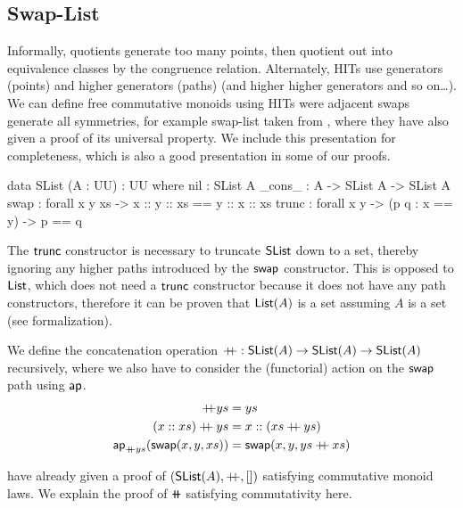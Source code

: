 \subsection{Swap-List}\label{cmon:slist}

Informally, quotients generate too many points, then quotient out into equivalence classes by the congruence relation.
%
Alternately, HITs use generators (points) and higher generators (paths) (and higher higher generators and so on\ldots).
%
We can define free commutative monoids using HITs were adjacent swaps generate all symmetries,
for example swap-list taken from \cite{choudhuryFreeCommutativeMonoids2023}, where they have also given a proof of its
universal property. We include this presentation for completeness, which is also a good presentation in some of our
proofs.

\begin{code}
data SList (A : UU) : UU where
  nil : SList A
  _cons_ : A -> SList A -> SList A
  swap : forall x y xs -> x :: y :: xs == y :: x :: xs
  trunc : forall x y -> (p q : x == y) -> p == q
\end{code}
\vspace{1em}

The $\operatorname{\mathsf{trunc}}$ constructor is necessary to truncate $\operatorname{\mathsf{SList}}$ down to a set,
thereby ignoring any higher paths introduced by the $\operatorname{\mathsf{swap}}$ constructor.
This is opposed to $\operatorname{\mathsf{List}}$, which does not need a $\operatorname{\mathsf{trunc}}$ constructor
because it does not have any path constructors, therefore it can be proven that $\operatorname{\mathsf{List}}(A)$
is a set assuming $A$ is a set (see formalization).

\begin{definition}[Concatenation]
    We define the concatenation operation $\mathbin{+\kern -0.4em+} : \operatorname{\mathsf{SList}}(A) \to \operatorname{\mathsf{SList}}(A) \to \operatorname{\mathsf{SList}}(A)$
    recursively, where we also have to consider the (functorial) action on the $\operatorname{\mathsf{swap}}$ path using $\operatorname{\mathsf{ap}}$.
    \begin{align*}
        [] \doubleplus ys                                 & = ys                                   \\
        (x :: xs) \doubleplus ys                          & = x :: (xs \doubleplus ys)             \\
        \term{ap}_{\doubleplus ys}(\term{swap}(x, y, xs)) & = \term{swap}(x, y, ys \doubleplus xs)
    \end{align*}
\end{definition}

\cite{choudhuryFreeCommutativeMonoids2023} have already given a proof of $(\operatorname{\mathsf{SList}}(A), \mathbin{+\kern -0.4em+}, [])$ satisfying
commutative monoid laws. We explain the proof of $\doubleplus$ satisfying commutativity here.

